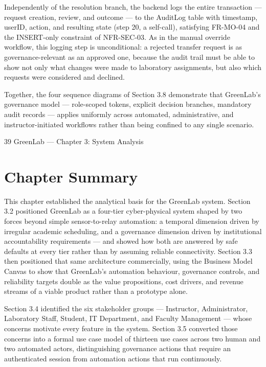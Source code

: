 Independently of the resolution branch, the backend logs the entire transaction --- request creation,
review, and outcome --- to the AuditLog table with timestamp, userID, action, and resulting state
(step 20, a self-call), satisfying FR-MO-04 and the INSERT-only constraint of NFR-SEC-03. As in
the manual override workflow, this logging step is unconditional: a rejected transfer request is as
governance-relevant as an approved one, because the audit trail must be able to show not only what
changes were made to laboratory assignments, but also which requests were considered and
declined.

Together, the four sequence diagrams of Section 3.8 demonstrate that GreenLab's governance
model --- role-scoped tokens, explicit decision branches, mandatory audit records --- applies
uniformly across automated, administrative, and instructor-initiated workflows rather than being
confined to any single scenario.




39
GreenLab --- Chapter 3: System Analysis



\section{Chapter Summary}

This chapter established the analytical basis for the GreenLab system. Section 3.2 positioned
GreenLab as a four-tier cyber-physical system shaped by two forces beyond simple sensor-to-relay
automation: a temporal dimension driven by irregular academic scheduling, and a governance
dimension driven by institutional accountability requirements --- and showed how both are
answered by safe defaults at every tier rather than by assuming reliable connectivity. Section 3.3
then positioned that same architecture commercially, using the Business Model Canvas to show
that GreenLab's automation behaviour, governance controls, and reliability targets double as the
value propositions, cost drivers, and revenue streams of a viable product rather than a prototype
alone.

Section 3.4 identified the six stakeholder groups --- Instructor, Administrator, Laboratory Staff,
Student, IT Department, and Faculty Management --- whose concerns motivate every feature in the
system. Section 3.5 converted those concerns into a formal use case model of thirteen use cases
across two human and two automated actors, distinguishing governance actions that require an
authenticated session from automation actions that run continuously.

